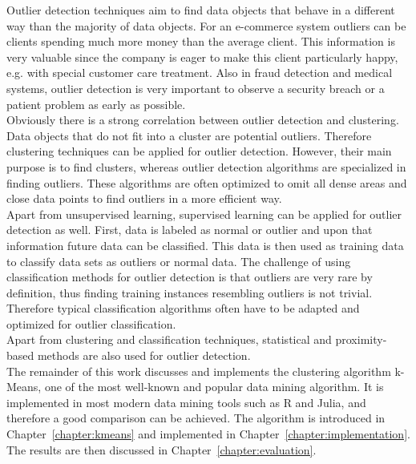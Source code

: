 Outlier detection techniques aim to find data objects that behave in a different way than the majority of data objects. For an e-commerce system outliers can be clients spending much more money than the average client. This information is very valuable since the company is eager to make this client particularly happy, e.g. with special customer care treatment. Also in fraud detection and medical systems, outlier detection is very important to observe a security breach or a patient problem as early as possible.
\\
Obviously there is a strong correlation between outlier detection and clustering. Data objects that do not fit into a cluster are potential outliers. Therefore clustering techniques can be applied for outlier detection. However, their main purpose is to find clusters, whereas outlier detection algorithms are specialized in finding outliers. These algorithms are often optimized to omit all dense areas and close data points to find outliers in a more efficient way.
\\
Apart from unsupervised learning, supervised learning can be applied for outlier detection as well. First, data is labeled as normal or outlier and upon that information future data can be classified. This data is then used as training data to classify data sets as outliers or normal data. The challenge of using classification methods for outlier detection is that outliers are very rare by definition, thus finding training instances resembling outliers is not trivial. Therefore typical classification algorithms often have to be adapted and optimized for outlier classification.
\\
Apart from clustering and classification techniques, statistical and proximity-based methods are also used for outlier detection.
\\
The remainder of this work discusses and implements the clustering algorithm k-Means, one of the most well-known and popular data mining algorithm. It is implemented in most modern data mining tools such as R and Julia, and therefore a good comparison can be achieved. The algorithm is introduced in Chapter~\ref{chapter:kmeans} and implemented in Chapter~\ref{chapter:implementation}. The results are then discussed in Chapter~\ref{chapter:evaluation}.

